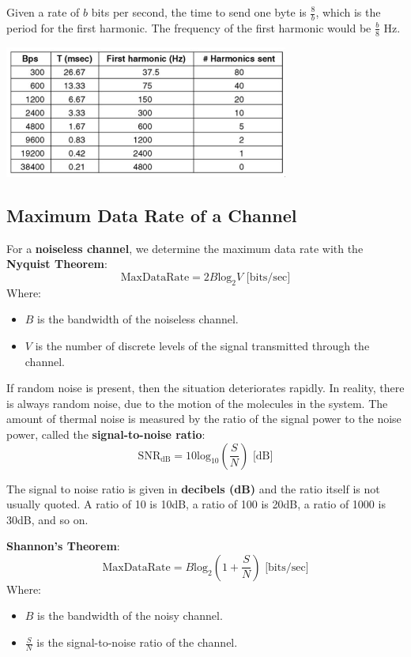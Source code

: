 \documentclass[11pt]{article}
\begin{document}
Given a rate of $b$ bits per second, the time to send one byte is $\frac{8}{b}$, which is the period for the first harmonic. 
The frequency of the first harmonic would be $\frac{b}{8}$ Hz. 

\begin{center}
    \includegraphics[width=0.7\textwidth]{bps.png}
\end{center}

\subsection{Maximum Data Rate of a Channel}
For a \textbf{noiseless channel}, we determine the maximum data rate with the \textbf{Nyquist Theorem}: 
\[ 
    \text{MaxDataRate} = 2B \text{log}_2V  \text{    [bits/sec]}
\] 
Where:
\begin{itemize}
    \item $B$ is the bandwidth of the noiseless channel. 
    \item $V$ is the number of discrete levels of the signal transmitted through the channel. 
\end{itemize}

If random noise is present, then the situation deteriorates rapidly. 
In reality, there is always random noise, due to the motion of the molecules in the system. 
The amount of thermal noise is measured by the ratio of the signal power to the noise power, called the \textbf{signal-to-noise ratio}: 
\[
    \text{SNR}_{\text{dB}} = 10\text{log}_{10} \left(\frac{S}{N} \right) \text{    [dB]}
\]

The signal to noise ratio is given in \textbf{decibels (dB)} and the ratio itself is not usually quoted. 
A ratio of 10 is 10dB, a ratio of 100 is 20dB, a ratio of 1000 is 30dB, and so on. 

\textbf{Shannon's Theorem}:
\[
    \text{MaxDataRate} = B \text{log}_2 \left( 1 + \frac{S}{N} \right) \text{    [bits/sec]}
\] 
Where:
\begin{itemize} 
    \item $B$ is the bandwidth of the noisy channel. 
    \item $\frac{S}{N}$ is the signal-to-noise ratio of the channel. 
\end{itemize} 
\end{document}
